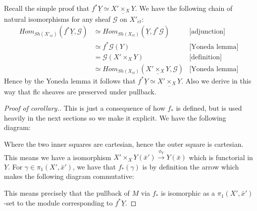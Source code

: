 \documentclass{ucbthesis}
\theoremstyle{definition}
\theoremstyle{theorem}
\begin{document}
Recall the simple proof that $f^{*}\underline{Y} \simeq \underline{X'\times_{X}Y}$. We have the following chain of natural isomorphisms for any sheaf $\mathcal{G}$ on $X'_{\acute{e}t}$:
\begin{align*}
Hom_{Sh(X'_{\acute{e}t})}(f^{*}\underline{Y},\mathcal{G}) &\simeq Hom_{Sh(X_{\acute{e}t})}(\underline{Y},f^{*}\mathcal{G}) &\text{[adjunction]}\\
&\simeq f^{*}\mathcal{G}(Y) &\text{[Yoneda lemma]}\\
&= \mathcal{G}(X'\times_{X}Y) &\text{[definition]}\\
&\simeq Hom_{Sh(X_{\acute{e}t})}(\underline{X'\times_{X}Y},\mathcal{G}) &\text{[Yoneda lemma]}
\end{align*}
Hence by the Yoneda lemma it follows that $f^{*}\underline{Y}\simeq \underline{X'\times_{X}Y}$. Also we derive in this way that flc sheaves are preserved under pullback. 

\begin{proof}[Proof of corollary.]
This is just a consequence of how $f_{*}$ is defined, but is used heavily in the next sections so we make it explicit. We have the following diagram:
\begin{center}
\end{center}
Where the two inner squares are cartesian, hence the outer square is cartesian. This means we have a isomorphism $X'\times_{X}Y(\bar{x}') \xrightarrow{\phi_{Y}} Y(\bar{x})$ which is functorial in $Y$. For $\gamma \in \pi_{1}(X',\bar{x}')$, we have that $f_{*}(\gamma)$ is by definition the arrow which makes the following diagram commutative:
\begin{center}
\end{center}
This means precisely that the pullback of $M$ via $f_{*}$ is isomorphic as a $\pi_{1}(X',\bar{x}')$-set to the module corresponding to $f^{*}\underline{Y}$. 
\end{proof}
\end{document}
